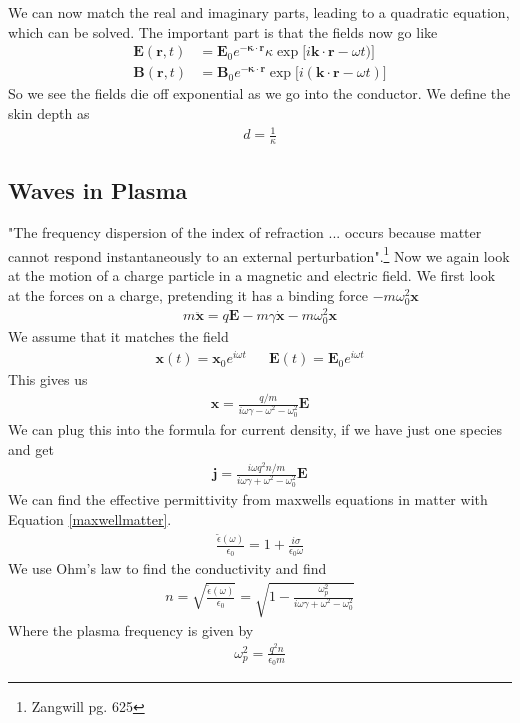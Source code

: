 We can now match the real and imaginary parts, leading to a quadratic equation, which can be solved. The important part is that the fields now go like
\begin{align}
\textbf{E}(\textbf{r},t) &= \textbf{E}_0e^{-\boldsymbol{\kappa}\cdot\textbf{r}}\kappa\exp\Big[i\textbf{k}\cdot\textbf{r}-\omega t)\Big]\\
\textbf{B}(\textbf{r},t) &= \textbf{B}_0e^{-\boldsymbol{\kappa}\cdot\textbf{r}}\exp\Big[i(\textbf{k}\cdot\textbf{r}-\omega t)\Big]
\end{align}
So we see the fields die off exponential as we go into the conductor. We define the skin depth as
\begin{align}
d = \frac{1}{\kappa}
\end{align}




\subsection{Waves in Plasma}


"The frequency dispersion of the index of refraction ... occurs because matter cannot respond instantaneously to an external perturbation".\footnote{Zangwill pg. 625} Now we again look at the motion of a charge particle in a magnetic and electric field. We first look at the forces on a charge, pretending it has a binding force $-m\omega_0^2\textbf{x}$
\begin{align}
m\ddot{\textbf{x}} = q\textbf{E} -m\gamma\dot{\textbf{x}} - m\omega_0^2\textbf{x}
\end{align}
We assume that it matches the field
\begin{align}
\textbf{x}(t) = \textbf{x}_0e^{i\omega t} &&\textbf{E}(t) = \textbf{E}_0e^{i\omega t}
\end{align}
This gives us
\begin{align}
\textbf{x} = \frac{q/m}{i\omega\gamma - \omega^2-\omega_0^2}\textbf{E}
\end{align}
We can plug this into the formula for current density, if we have just one species and get
\begin{align}
\textbf{j} = \frac{i\omega q^2n/m}{i\omega\gamma + \omega^2-\omega_0^2}\textbf{E}
\end{align}
We can find the effective permittivity from maxwells equations in matter with Equation \ref{maxwellmatter}. 
\begin{align}
\frac{\tilde\epsilon(\omega)}{\epsilon_0} = 1 + \frac{i\sigma}{\epsilon_0 \omega}
\end{align}
We use Ohm's law to find the conductivity and find
\begin{align}
n = \sqrt{\frac{\tilde\epsilon(\omega)}{\epsilon_0}} = \sqrt{1- \frac{\omega_p^2}{i\omega\gamma + \omega^2-\omega_0^2}}
\end{align}
Where the plasma frequency is given by
\begin{align}
\boxed{\omega_p^2 = \frac{q^2n}{\epsilon_0 m}}
\end{align}




